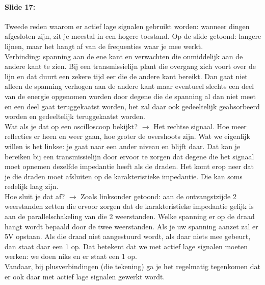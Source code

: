 \documentclass[10pt,a4paper]{book}
\begin{document}
\paragraph{Slide 17:} Tweede reden waarom er actief lage signalen gebruikt worden: wanneer dingen afgesloten zijn, zit je meestal in een hogere toestand. Op de slide getoond: langere lijnen, maar het hangt af van de frequenties waar je mee werkt.\\
Verbinding: spanning aan de ene kant en verwachten die onmiddelijk aan de andere kant te zien. Bij een transmissielijn plant die overgang zich voort over de lijn en dat duurt een zekere tijd eer die de andere kant bereikt. Dan gaat niet alleen de spanning verhogen aan de andere kant maar eventueel slechts een deel van de energie opgenomen worden door degene die de spanning al dan niet meet en een deel gaat teruggekaatst worden, het zal daar ook gedeeltelijk geabsorbeerd worden en gedeeltelijk teruggekaatst worden.\\
Wat als je dat op een oscilloscoop bekijkt? $\rightarrow$ Het rechtse signaal. Hoe meer reflecties er heen en weer gaan, hoe groter de overshoots zijn. Wat we eigenlijk willen is het linkse: je gaat naar een ander niveau en blijft daar. Dat kan je bereiken bij een transmissielijn door ervoor te zorgen dat degene die het signaal moet opnemen dezelfde impedantie heeft als de draden. Het komt erop neer dat je die draden moet afsluiten op de karakteristieke impedantie. Die kan soms redelijk laag zijn. \\
Hoe sluit je dat af? $\rightarrow$ Zoals linksonder getoond: aan de ontvangstzijde 2 weerstanden zetten die ervoor zorgen dat de karakteristieke impedantie gelijk is aan de parallelschakeling van die 2 weerstanden. Welke spanning er op de draad hangt wordt bepaald door de twee weerstanden. Als je uw spanning aanzet zal er 5V opstaan. Als die draad niet aangestuurd wordt, als daar niets mee gebeurt, dan staat daar een 1 op. Dat betekent dat we met actief lage signalen moeten werken: we doen niks en er staat een 1 op.\\
Vandaar, bij plusverbindingen (die tekening) ga je het regelmatig tegenkomen dat er ook daar met actief lage signalen gewerkt wordt. 
\end{document}
